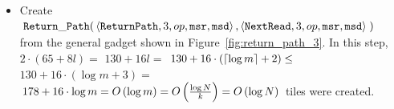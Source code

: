\begin{itemize}
    \item Create
    $\begin{aligned}[t]
        \returnpath(& \left\langle {\tt ReturnPath}, 3, \inc, {\tt msr}, {\tt msd} \right\rangle,
                      \left\langle {\tt NextRead},   3, \inc, {\tt msr}, {\tt msd} \right\rangle \;)
    \end{aligned}$\\from the general gadget shown in Figure~\ref{fig:return_path_3}.
    In this step, $2 \cdot \left( 65 + 8l \right) =$
    $130 + 16l =$
    $130 + 16 \cdot \left( \ceil*{\log m} + 2 \right) \leq$
    $130 + 16 \cdot \left( {\log m} + 3 \right) =$
    $178 + 16 \cdot {\log m} = \bigologm$ tiles were created.
\end{itemize}

\begin{figure}[H]
    \centering
    ~
\end{figure}
